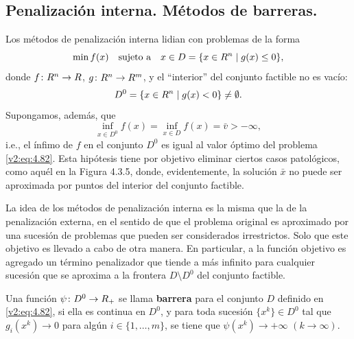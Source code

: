 
\subsection{Penalización interna. Métodos de barreras.}\label{v2:sec:4.3.3}

Los métodos de penalización interna lidian con problemas de la forma
\begin{equation}
    \min f(x) \quad \text{sujeto a} \quad x \in D = \{x \in R^n \mid g(x) \le 0\},
    \label{v2:eq:4.82}
\end{equation}
donde $f \colon R^n \to R$, $g \colon R^n \to R^m$, y el ``interior'' del conjunto factible no es vacío:
\begin{equation}
    D^0 = \{x \in R^n \mid g(x) < 0\} \neq \emptyset.
    \label{v2:eq:4.83}
\end{equation}
Supongamos, además, que
\begin{equation}
    \inf_{x \in D^0} f(x) = \inf_{x \in D} f(x) = \bar{v} > -\infty,
    \label{v2:eq:4.84}
\end{equation}
i.e., el ínfimo de $f$ en el conjunto $D^0$ es igual al valor óptimo del problema \eqref{v2:eq:4.82}. Esta hipótesis tiene por objetivo eliminar ciertos casos patológicos, como aquél en la Figura 4.3.5, donde, evidentemente, la solución $\bar{x}$ no puede ser aproximada por puntos del interior del conjunto factible.


La idea de los métodos de penalización interna es la misma que la de la penalización externa, en el sentido de que el problema original es aproximado por una sucesión de problemas que pueden ser considerados irrestrictos. Solo que este objetivo es llevado a cabo de otra manera. En particular, a la función objetivo es agregado un término penalizador que tiende a más infinito para cualquier sucesión que se aproxima a la frontera $D \setminus D^0$ del conjunto factible.

\begin{definition}\label{v2:def:4.3.1}
    Una función $\psi \colon D^0 \to R_+$ se llama \textbf{barrera} para el conjunto $D$ definido en \eqref{v2:eq:4.82}, si ella es continua en $D^0$, y para toda sucesión $\{x^k\} \in D^0$ tal que $g_i(x^k) \to 0$ para algún $i \in \{1, \dots, m\}$, se tiene que $\psi(x^k) \to +\infty$ $(k \to \infty)$.
\end{definition}

